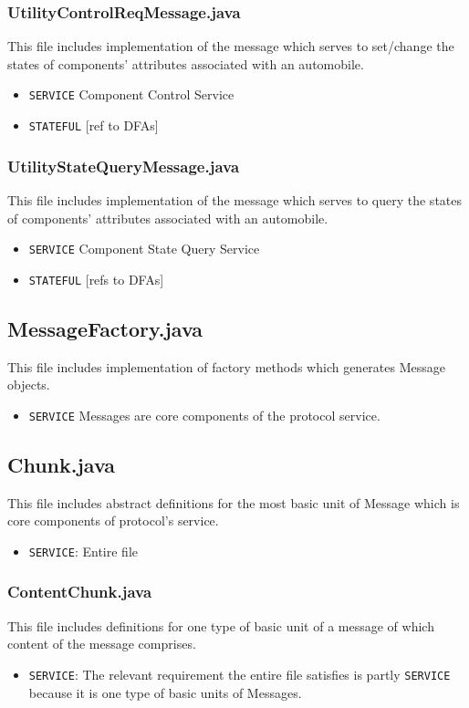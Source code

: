\documentclass[12pt]{usenixsubmit}
\begin{document}
    \subsubsection{UtilityControlReqMessage.java}This file includes implementation of the message which serves to set/change the states of components' attributes associated with an automobile.
     \begin{itemize}
     \item {\tt SERVICE}  Component Control Service
     \item {\tt STATEFUL} [ref to DFAs]
     \end{itemize}

     \subsubsection{UtilityStateQueryMessage.java} This file includes implementation of the message which serves to query the states of components' attributes associated with an automobile.
     \begin{itemize}
     \item {\tt SERVICE}  Component State Query Service
     \item {\tt STATEFUL} [refs to DFAs]
     \end{itemize} 
     
    \subsection{MessageFactory.java} This file includes implementation of factory methods which generates Message objects.
     \begin{itemize}
     \item {\tt SERVICE}  Messages are core components of the protocol service. 
     \end{itemize}
     
     \subsection{Chunk.java} This file includes abstract definitions for the most basic unit of Message which is core components of protocol's service.
     \begin{itemize}
     \item {\tt SERVICE}: Entire file 
     \end{itemize}

    \subsubsection{ContentChunk.java}This file includes definitions for one type of basic unit of a message of which content of the message comprises.
    \begin{itemize}
     \item {\tt SERVICE}: The relevant requirement the entire file satisfies is partly {\tt SERVICE} because it is one type of basic units of Messages.
     \end{itemize}
\end{document}
